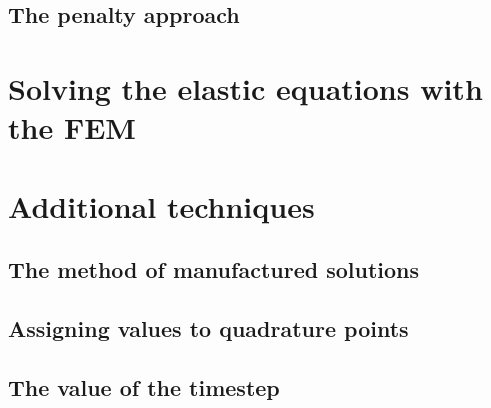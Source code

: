 \documentclass[a4paper]{article}
\begin{document}
\subsection{The penalty approach}


\newpage
\section{Solving the elastic equations with the FEM}









\newpage
\section{Additional techniques}

\newpage %
\subsection{The method of manufactured solutions}  %

\subsection{Assigning values to quadrature points}









 



\newpage
\subsection{The value of the timestep}
\end{document}
